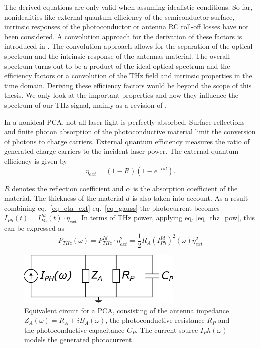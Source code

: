 The derived equations are only valid when assuming idealistic conditions. So far, nonidealities like external quantum efficiency of the semiconductor surface, intrinsic responses of the photoconductor or antenna RC roll-off losses have not been considered. A convolution approach for the derivation of these factors is introduced in \cite{preuUnifiedDerivationTerahertz2014}. The convolution approach allows for the separation of the optical spectrum and the intrinsic response of the antennas material. The overall spectrum turns out to be a product of the ideal optical spectrum and the efficiency factors or a convolution of the THz field and intrinsic properties in the time domain. Deriving these efficiency factors would be beyond the scope of this thesis. We only look at the important properties and how they influence the spectrum of our THz signal, mainly as a revision of \cite{faridiPulsedFreeSpace2023}.

In a nonideal PCA, not all laser light is perfectly absorbed. Surface reflections and finite photon absorption of the photoconductive material limit the conversion of photons to charge carriers. External quantum efficiency measures the ratio of generated charge carriers to the incident laser power. The external quantum efficiency is given by 
\begin{equation}
	\eta_{ext} = (1-R)(1-e^{-\alpha d}). 
	\label{eq_eta_ext}
\end{equation}

$R$ denotes the reflection coefficient and $\alpha$ is the absorption coefficient of the material. The thickness of the material $d$ is also taken into account. As a result combining eq.~\eqref{eq_eta_ext} eq.~\eqref {eq_gauss} the photocurrent becomes $I_{Ph}(t) = I_{Ph}^{Id}(t) \cdot \eta_{ext}$. In terms of THz power, applying eq. \eqref{eq_thz_pow}, this can be expressed as  
\begin{equation}
	P_{THz}(\omega) = P_{THz}^{Id} \cdot \eta_{ext}^2 = \frac{1}{2}R_A (I_{Ph}^{Id})^2(\omega)\eta_{ext}^2
\end{equation}

\begin{figure}[ht]
	\centering
	\includegraphics[width=0.7\textwidth]{figures/eq_circuit_PCA.pdf}
	\captionsetup{width=\textwidth}
	\caption{Equivalent circuit for a PCA, consisting of the antenna impedance $Z_A(\omega) = R_A + iB_A(\omega)$, the photoconductive resistance $R_P$ and the photoconductive capacitance $C_P$. The current source $I_Ph(\omega)$ models the generated photocurrent.}
	\label{PCA_eq}
\end{figure}


